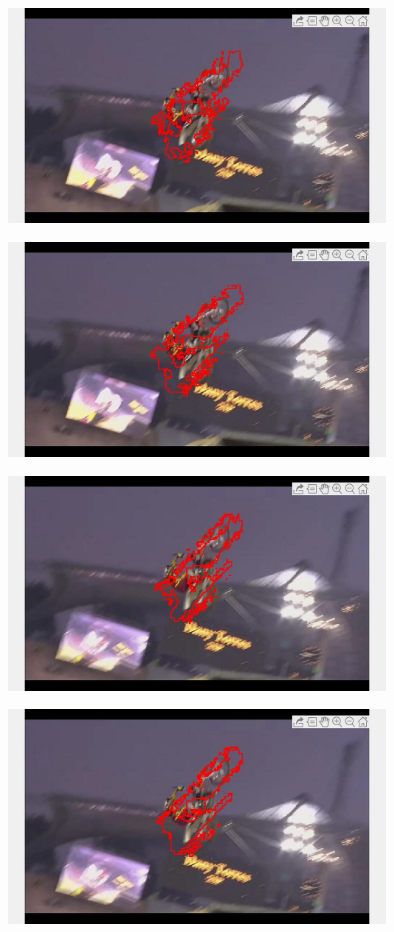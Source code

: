 \documentclass{article}
\begin{document}
	\begin{center}
		\includegraphics[width=100mm]{img/b3}
	\end{center}
	
	\begin{center}
		\includegraphics[width=100mm]{img/b4}
	\end{center}
	
	\begin{center}
		\includegraphics[width=100mm]{img/b5}
	\end{center}
	
	\begin{center}
		\includegraphics[width=100mm]{img/b6}
	\end{center}
\end{document}
